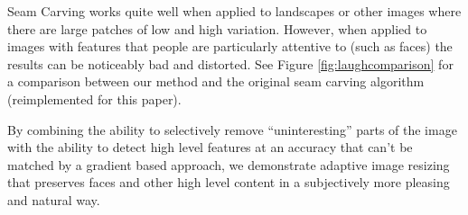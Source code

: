 \documentclass[10pt,twocolumn,letterpaper]{article}
\begin{document}
Seam Carving works quite well when applied to landscapes or other images where
there are large patches of low and high variation. However, when applied to
images with features that people are particularly attentive to (such as faces)
the results can be noticeably bad and distorted. See Figure
\ref{fig:laughcomparison} for a comparison between our method and the original seam
carving algorithm (reimplemented for this paper).

By combining the ability to selectively remove ``uninteresting'' parts of the
image with the ability to detect high level features at an accuracy that can't
be matched by a gradient based approach, we demonstrate adaptive image resizing
that preserves faces and other high level content in a subjectively more
pleasing and natural way.

\begin{figure}[t]
  \centering
  \qquad
  \qquad

\end{figure}
\end{document}
